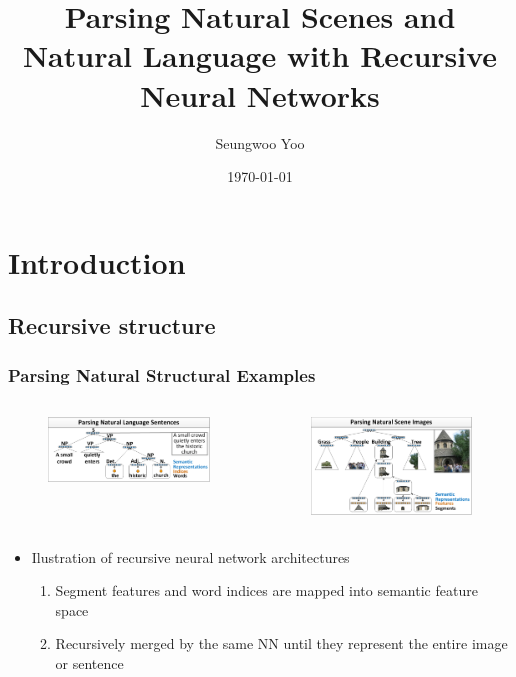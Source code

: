\documentclass{beamer}
\title{Parsing Natural Scenes and Natural Language with Recursive Neural Networks}
\author{Seungwoo Yoo}
\date{\today}
\begin{document}
\frame{\titlepage}

\section[Outline]{}
\frame{\tableofcontents}

\section{Introduction}
\subsection{Recursive structure}
\frame
{
  \frametitle{Parsing Natural Structural Examples}
  \begin{columns}
  \begin{figure}[ht]  
	  \begin{center}
		  \includegraphics[width=2.1in]{images/fig1.png}   
	  \end{center}   
  \end{figure}
  \begin{figure}[ht]
	  \begin{center}
		  \includegraphics[width=2.1in]{images/fig2.png} 
	  \end{center}
  \end{figure}
  \end{columns}
  \begin{itemize}
  \item Ilustration of recursive neural network architectures
	\begin{enumerate}
	\item Segment features and word indices are mapped into semantic feature space
	\item Recursively merged by the same NN until they represent the entire image or sentence
	\end{enumerate}
  \end{itemize}
}
\end{document}
